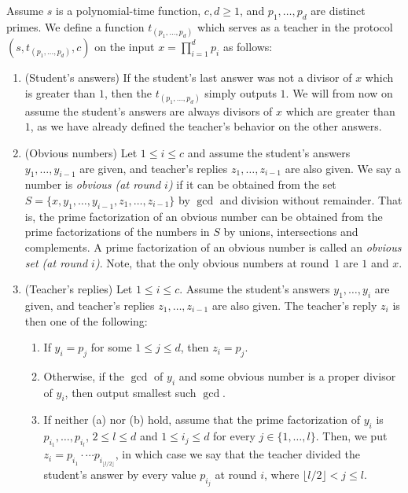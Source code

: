 \documentclass{lmcs}
\newcommand{\floor}[1]{\lfloor #1\rfloor}
\begin{document}
\begin{defi}\label{defiteacher}
    Assume $s$ is a polynomial-time function, $c,d\geq 1$, and $p_1,\dots,p_d$ are distinct primes. We define a function $t_{(p_1,\dots,p_{d})}$ which serves as a teacher in the protocol $(s,t_{(p_1,\dots,p_d)},c)$ on the input $x=\prod_{i=1}^d p_i$ as follows:
    \begin{enumerate}
        \item (Student's answers) If the student's last answer was not a divisor of $x$ which is greater than $1$, then the $t_{(p_1,\dots,p_d)}$ simply outputs $1$. We will from now on assume the student's answers are always divisors of $x$ which are greater than $1$, as we have already defined the teacher's behavior on the other answers.
        \item (Obvious numbers) Let $1\leq i\leq c$ and assume the student's answers $y_1,\dots,y_{i-1}$ are given, and teacher's replies $z_1,\dots,z_{i-1}$ are also given. We say a number is \emph{obvious (at round $i$)} if it can be obtained from the set $S=\{x,y_1,\dots,y_{i-1},z_1,\dots,z_{i-1}\}$ by $\gcd$ and division without remainder. That is, the prime factorization of an obvious number can be obtained from the prime factorizations of the numbers in $S$ by unions, intersections and complements. A prime factorization of an obvious number is called an \emph{obvious set (at round $i$)}. Note, that the only obvious numbers at round~$1$ are $1$ and $x$.
        \item (Teacher's replies) Let $1\leq i\leq c$. Assume the student's answers $y_1,\dots,y_{i}$ are given, and teacher's replies $z_1,\dots,z_{i-1}$ are also given. The teacher's reply $z_i$ is then one of the following:
        \begin{enumerate}
            \item If $y_i = p_j$ for some $1\leq j \leq d$, then $z_i=p_j$.
            \item Otherwise, if the $\gcd$ of $y_i$ and some obvious number is a proper divisor of $y_i$, then output smallest such $\gcd$.
            \item If neither (a) nor (b) hold, assume that the prime factorization of  $y_i$ is $p_{i_1},\dots,p_{i_{l}}$, $2\leq l\leq d$ and $1\leq i_j\leq d$ for every $j\in \{1,\dots,l\}$. Then, we put $z_i=p_{i_1}\cdot \cdots p_{i_{\floor{l/2}}}$, in which case we say that the teacher divided the student's answer by every value $p_{i_j}$ at round $i$, where $\floor{l/2} < j\leq l$.
        \end{enumerate}
    \end{enumerate}
\end{defi}
\end{document}
